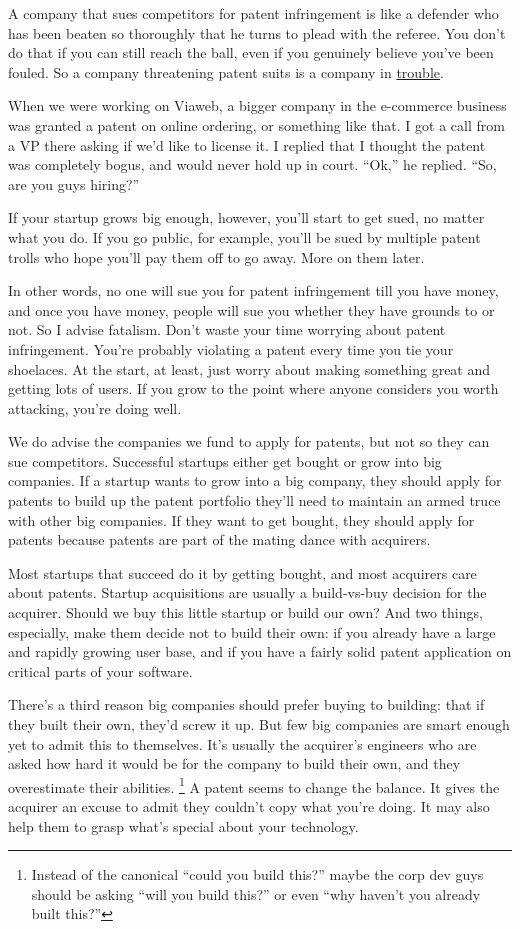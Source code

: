 \documentclass[12pt]{book}
\begin{document}
A company that sues competitors for patent infringement is like a
defender who has been beaten so thoroughly that he turns to plead with
the referee. You don't do that if you can still reach the ball, even if
you genuinely believe you've been fouled. So a company threatening
patent suits is a company in
\href{http://www.theregister.co.uk/2006/03/15/azul_sues_sun/}{trouble}.

When we were working on Viaweb, a bigger company in the e-commerce
business was granted a patent on online ordering, or something like
that. I got a call from a VP there asking if we'd like to license it. I
replied that I thought the patent was completely bogus, and would never
hold up in court. ``Ok,'' he replied. ``So, are you guys hiring?''

If your startup grows big enough, however, you'll start to get sued, no
matter what you do. If you go public, for example, you'll be sued by
multiple patent trolls who hope you'll pay them off to go away. More on
them later.

In other words, no one will sue you for patent infringement till you
have money, and once you have money, people will sue you whether they
have grounds to or not. So I advise fatalism. Don't waste your time
worrying about patent infringement. You're probably violating a patent
every time you tie your shoelaces. At the start, at least, just worry
about making something great and getting lots of users. If you grow to
the point where anyone considers you worth attacking, you're doing well.

We do advise the companies we fund to apply for patents, but not so they
can sue competitors. Successful startups either get bought or grow into
big companies. If a startup wants to grow into a big company, they
should apply for patents to build up the patent portfolio they'll need
to maintain an armed truce with other big companies. If they want to get
bought, they should apply for patents because patents are part of the
mating dance with acquirers.

Most startups that succeed do it by getting bought, and most acquirers
care about patents. Startup acquisitions are usually a build-vs-buy
decision for the acquirer. Should we buy this little startup or build
our own? And two things, especially, make them decide not to build their
own: if you already have a large and rapidly growing user base, and if
you have a fairly solid patent application on critical parts of your
software.

There's a third reason big companies should prefer buying to building:
that if they built their own, they'd screw it up. But few big companies
are smart enough yet to admit this to themselves. It's usually the
acquirer's engineers who are asked how hard it would be for the company
to build their own, and they overestimate their abilities.
\footnote{Instead of the canonical ``could you build this?'' maybe the
corp dev guys should be asking ``will you build this?'' or even ``why
haven't you already built this?''} A patent seems to change the balance. It gives
the acquirer an excuse to admit they couldn't copy what you're doing. It
may also help them to grasp what's special about your technology.
\end{document}
